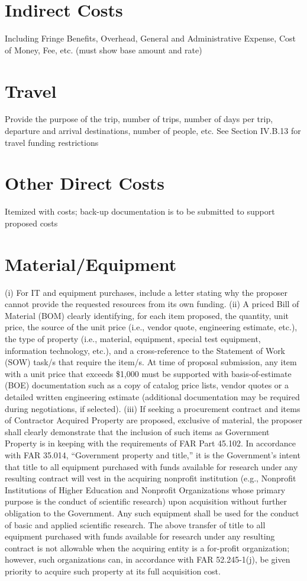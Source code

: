 \section{Indirect Costs}
Including Fringe Benefits, Overhead, General and Administrative Expense, Cost of Money,
Fee, etc. (must show base amount and rate)
\section{Travel}
Provide the purpose of the trip, number of trips, number of days per trip, departure and
arrival destinations, number of people, etc. See Section IV.B.13 for travel funding
restrictions
\section{Other Direct Costs}
Itemized with costs; back-up documentation is to be submitted to support proposed costs
\section{Material/Equipment}
(i) For IT and equipment purchases, include a letter stating why the proposer cannot provide
the requested resources from its own funding.
(ii) A priced Bill of Material (BOM) clearly identifying, for each item proposed, the
quantity, unit price, the source of the unit price (i.e., vendor quote, engineering estimate,
etc.), the type of property (i.e., material, equipment, special test equipment, information
technology, etc.), and a cross-reference to the Statement of Work (SOW) task/s that require
the item/s. At time of proposal submission, any item with a unit price that exceeds \$1,000
must be supported with basis-of-estimate (BOE) documentation such as a copy of catalog
price lists, vendor quotes or a detailed written engineering estimate (additional
documentation may be required during negotiations, if selected).
(iii) If seeking a procurement contract and items of Contractor Acquired Property are
proposed, exclusive of material, the proposer shall clearly demonstrate that the inclusion of
such items as Government Property is in keeping with the requirements of FAR Part 45.102.
In accordance with FAR 35.014, “Government property and title,” it is the Government’s
intent that title to all equipment purchased with funds available for research under any
resulting contract will vest in the acquiring nonprofit institution (e.g., Nonprofit Institutions
of Higher Education and Nonprofit Organizations whose primary purpose is the conduct of
scientific research) upon acquisition without further obligation to the Government. Any such
equipment shall be used for the conduct of basic and applied scientific research. The above
transfer of title to all equipment purchased with funds available for research under any
resulting contract is not allowable when the acquiring entity is a for-profit organization;
however, such organizations can, in accordance with FAR 52.245-1(j), be given priority to
acquire such property at its full acquisition cost.
